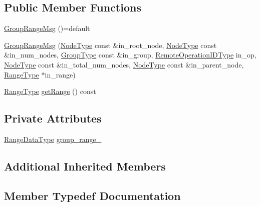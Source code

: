 \subsection*{Public Member Functions}
\begin{DoxyCompactItemize}
\item 
\hyperlink{structvt_1_1group_1_1_group_range_msg_a40399408026b4e5f866bfbf8e33ed735}{Group\+Range\+Msg} ()=default
\item 
\hyperlink{structvt_1_1group_1_1_group_range_msg_abdce0fab287c1c31fc36ce73a931f5e9}{Group\+Range\+Msg} (\hyperlink{namespacevt_a866da9d0efc19c0a1ce79e9e492f47e2}{Node\+Type} const \&in\+\_\+root\+\_\+node, \hyperlink{namespacevt_a866da9d0efc19c0a1ce79e9e492f47e2}{Node\+Type} const \&in\+\_\+num\+\_\+nodes, \hyperlink{namespacevt_a27b5e4411c9b6140c49100e050e2f743}{Group\+Type} const \&in\+\_\+group, \hyperlink{namespacevt_1_1group_a73f2624ddeb535b39a08b6524f26b244}{Remote\+Operation\+I\+D\+Type} in\+\_\+op, \hyperlink{namespacevt_a866da9d0efc19c0a1ce79e9e492f47e2}{Node\+Type} const \&in\+\_\+total\+\_\+num\+\_\+nodes, \hyperlink{namespacevt_a866da9d0efc19c0a1ce79e9e492f47e2}{Node\+Type} const \&in\+\_\+parent\+\_\+node, \hyperlink{structvt_1_1group_1_1_group_range_msg_a49fdcbb2ae53a4c5778e60f306c8f5e6}{Range\+Type} $\ast$in\+\_\+range)
\item 
\hyperlink{structvt_1_1group_1_1_group_range_msg_a49fdcbb2ae53a4c5778e60f306c8f5e6}{Range\+Type} \hyperlink{structvt_1_1group_1_1_group_range_msg_a9a3b75cee8d60df55ecf7c6f7a3772f1}{get\+Range} () const
\end{DoxyCompactItemize}
\subsection*{Private Attributes}
\begin{DoxyCompactItemize}
\item 
\hyperlink{structvt_1_1group_1_1_group_range_msg_a893386277e3598ae990bea8245aee1f3}{Range\+Data\+Type} \hyperlink{structvt_1_1group_1_1_group_range_msg_affc9dc8fa60a656874103d836ba5a3b8}{group\+\_\+range\+\_\+}
\end{DoxyCompactItemize}
\subsection*{Additional Inherited Members}


\subsection{Member Typedef Documentation}
\mbox{\label{structvt_1_1group_1_1_group_range_msg_a893386277e3598ae990bea8245aee1f3}} 

